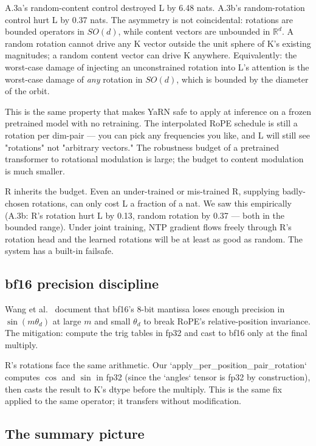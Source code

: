 \documentclass[10pt, twocolumn, a4paper]{article}
\begin{document}
A.3a's random-content control destroyed L by 6.48 nats. A.3b's random-rotation control hurt L by 0.37 nats. The asymmetry is not coincidental: rotations are bounded operators in $SO(d)$, while content vectors are unbounded in $\mathbb{R}^d$. A random rotation cannot drive any K vector outside the unit sphere of K's existing magnitudes; a random content vector can drive K anywhere. Equivalently: the worst-case damage of injecting an unconstrained rotation into L's attention is the worst-case damage of \emph{any} rotation in $SO(d)$, which is bounded by the diameter of the orbit.

This is the same property that makes YaRN safe to apply at inference on a frozen pretrained model with no retraining. The interpolated RoPE schedule is still a rotation per dim-pair --- you can pick any frequencies you like, and L will still see "rotations" not "arbitrary vectors." The robustness budget of a pretrained transformer to rotational modulation is large; the budget to content modulation is much smaller.

R inherits the budget. Even an under-trained or mis-trained R, supplying badly-chosen rotations, can only cost L a fraction of a nat. We saw this empirically (A.3b: R's rotation hurt L by 0.13, random rotation by 0.37 --- both in the bounded range). Under joint training, NTP gradient flows freely through R's rotation head and the learned rotations will be at least as good as random. The system has a built-in failsafe.

\subsection*{bf16 precision discipline}

Wang et al.~\cite{wang2024bf16rope} document that bf16's 8-bit mantissa loses enough precision in $\sin(m\theta_d)$ at large $m$ and small $\theta_d$ to break RoPE's relative-position invariance. The mitigation: compute the trig tables in fp32 and cast to bf16 only at the final multiply.

R's rotations face the same arithmetic. Our `apply\_per\_position\_pair\_rotation` computes $\cos$ and $\sin$ in fp32 (since the `angles` tensor is fp32 by construction), then casts the result to K's dtype before the multiply. This is the same fix applied to the same operator; it transfers without modification.

\subsection*{The summary picture}
\end{document}
